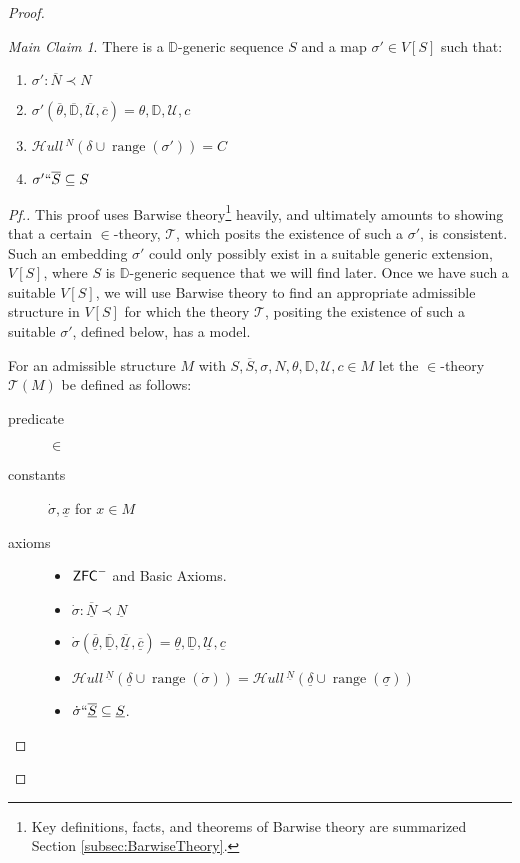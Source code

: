 \documentclass{amsart}
\theoremstyle{definition}
\theoremstyle{remark}
\newtheorem*{claim}{Main Claim}
\newcommand{\D}{\mathbb{D}}
\newcommand{\N}{{\overline{N}}}
\renewcommand{\S}{{\overline{S}}}
\newcommand{\U}{\mathcal{U}}
\newcommand{\ZFC}{\textup{\ensuremath{\textsf{ZFC}}}}
\DeclareMathOperator{\ran}{range}
\newcommand{\SH}{\mathcal{H}\textit{ull} \,}
\newcommand{\sk}[3]{\SH^{#1}( {#2} \cup {\ran(#3)} ) }
\begin{document}
\begin{proof}
\begin{claim} There is a $\D$-generic sequence $S$ and a map $\sigma' \in V[S]$ such that: \begin{enumerate}
	\item $\sigma': \N \prec N$
	\item $\sigma'(\overline \theta, \overline{\D}, \overline{\U}, \overline c)=\theta, \D, \U, c$
	\item \label{item:MainClaimC=Sk} $\sk{N}{\delta}{\sigma'} = C$	
	\item $\sigma' `` \S \subseteq S$
\end{enumerate} \end{claim}
\begin{proof}[Pf.]  This proof uses Barwise theory\footnote{Key definitions, facts, and theorems of Barwise theory are summarized Section \ref{subsec:BarwiseTheory}.} heavily, and ultimately amounts to showing that a certain 
$\in$-theory, $\mathcal T$, which posits the existence of such a $\sigma'$, is consistent. Such an embedding $\sigma'$ could only possibly exist in a suitable generic extension, $V[S]$, where $S$ is $\D$-generic sequence that we will find later. 
Once we have such a suitable $V[S]$, we will use Barwise theory to find an appropriate admissible structure in $V[S]$ for which the theory $\mathcal T$, positing the existence of such a suitable $\sigma'$, defined below, has a model.

\begin{samepage}
For an admissible structure $M$ with $S, \overline S, \sigma, N, \theta, \D, \U, c \in M$ let the $\in$-theory $\mathcal T(M)$ be defined as follows: 
\begin{description}
	\item[predicate] $\in$ 
	\item[constants] $\dot{\sigma}, \underline x$ for $x \in M$
	\item[axioms] \begin{itemize} \item $\ZFC^-$ and \textsf{Basic Axioms}.
		\item $\dot \sigma : \overline{\underline N} \prec \underline N$
		\item $\dot{\sigma}(\overline{\underline{\theta}}, \overline{\underline{\D}}, \overline{\underline{\U}}, \overline{\underline c})=\underline{\theta}, \underline{\D}, \underline{\U}, \underline{c}$
		\item $\sk{\underline N}{\underline{\delta}}{\dot \sigma} = \sk{\underline N}{\underline \delta}{\underline \sigma}$
		\item $\dot \sigma ``\overline{\underline S} \subseteq \underline S$.
	\end{itemize}
\end{description}
\end{samepage}


\end{proof}
\end{proof}
\end{document}
